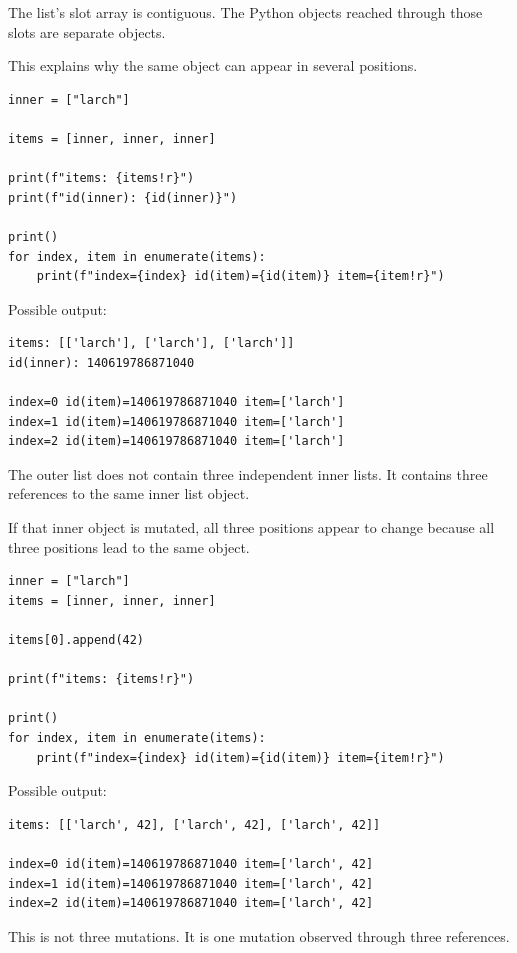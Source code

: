 The list's slot array is contiguous. The Python objects reached through those slots are separate objects.

This explains why the same object can appear in several positions.

\begin{verbatim}
inner = ["larch"]

items = [inner, inner, inner]

print(f"items: {items!r}")
print(f"id(inner): {id(inner)}")

print()
for index, item in enumerate(items):
    print(f"index={index} id(item)={id(item)} item={item!r}")
\end{verbatim}

Possible output:

\begin{verbatim}
items: [['larch'], ['larch'], ['larch']]
id(inner): 140619786871040

index=0 id(item)=140619786871040 item=['larch']
index=1 id(item)=140619786871040 item=['larch']
index=2 id(item)=140619786871040 item=['larch']
\end{verbatim}

The outer list does not contain three independent inner lists. It contains three references to the same inner list object.

If that inner object is mutated, all three positions appear to change because all three positions lead to the same object.

\begin{verbatim}
inner = ["larch"]
items = [inner, inner, inner]

items[0].append(42)

print(f"items: {items!r}")

print()
for index, item in enumerate(items):
    print(f"index={index} id(item)={id(item)} item={item!r}")
\end{verbatim}

Possible output:

\begin{verbatim}
items: [['larch', 42], ['larch', 42], ['larch', 42]]

index=0 id(item)=140619786871040 item=['larch', 42]
index=1 id(item)=140619786871040 item=['larch', 42]
index=2 id(item)=140619786871040 item=['larch', 42]
\end{verbatim}

This is not three mutations. It is one mutation observed through three references.

